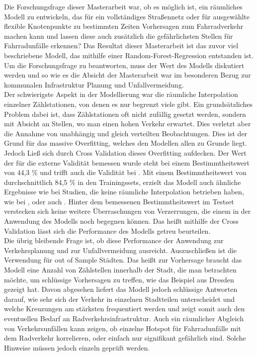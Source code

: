 \documentclass[a4paper,12pt]{thesis}
\begin{document}
Die Forschungsfrage dieser Masterarbeit war, ob es möglich ist, ein räumliches Modell zu entwickeln, das für ein vollständiges Straßennetz oder für ausgewählte flexible Knotenpunkte zu bestimmten Zeiten Vorhersagen zum Fahrradverkehr machen kann und lassen diese auch zusätzlich die gefährlichsten Stellen für Fahrradunfälle erkennen? Das Resultat dieser Masterarbeit ist das zuvor viel beschriebene Modell, das mithilfe einer Random-Forest-Regression entstanden ist. Um die Forschungsfrage zu beantworten, muss der Wert des Modells diskutiert werden und so wie es die Absicht der Masterarbeit war im besonderen Bezug zur kommunalen Infrastruktur Planung und Unfallvermeidung.\\
Der schwierigste Aspekt in der Modellierung war die räumliche Interpolation einzelner Zählstationen, von denen es nur begrenzt viele gibt. Ein grundsätzliches Problem dabei ist, dass Zählstationen oft nicht zufällig gesetzt werden, sondern mit Absicht an Stellen, wo man einen hohen Verkehr erwartet. Dies verletzt aber die Annahme von unabhängig und gleich verteilten Beobachtungen. Dies ist der Grund für das massive Overfitting, welches den Modellen allen zu Grunde liegt. Jedoch Ließ sich durch Cross Validation dieses Overfitting aufdecken. Der Wert der für die externe Validität bemessen wurde steht bei einem Bestimmtheitswert von 44,3 \% und trifft auch die Validität bei \cite{Alattar2021}. Mit einem Bestimmtheitswert von durchschnittlich 84,5 \% in den Trainingssets, erzielt das Modell auch ähnliche Ergebnisse wie bei Studien, die keine räumliche Interpolation betrieben haben, wie bei \cite{Holmgren2017}, \cite{Broucke2019} oder auch \cite{Wessel2020}. Hinter dem bemessenen Bestimmtheitswert im Testset verstecken sich keine weitere Überraschungen von Verzerrungen, die einem in der Anwendung des Modells noch begegnen können. Das heißt mithilfe der Cross Validation lässt sich die Performance des Modells getreu beurteilen.\\
Die übrig bleibende Frage ist, ob diese Performance der Anwendung zur Verkehrsplanung und zur Unfallvermeidung ausreicht. Auszuschließen ist die Verwendung für out of Sample Städten. Das heißt zur Vorhersage braucht das Modell eine Anzahl von Zählstellen innerhalb der Stadt, die man betrachten möchte, um schlüssige Vorhersagen zu treffen, wie das Beispiel aus Dresden gezeigt hat. Davon abgesehen liefert das Modell jedoch schlüssige Antworten darauf, wie sehr sich der Verkehr in einzelnen Stadtteilen unterscheidet und welche Kreuzungen am stärksten frequentiert werden und zeigt somit auch den eventuellen Bedarf an Radverkehrsinfrastruktur. Auch ein räumlicher Abgleich von Verkehrsunfällen kann zeigen, ob einzelne Hotspot für Fahrradunfälle mit dem Radverkehr korrelieren, oder einfach nur signifikant gefährlich sind. Solche Hinweise müssen jedoch einzeln geprüft werden.\\
\end{document}
